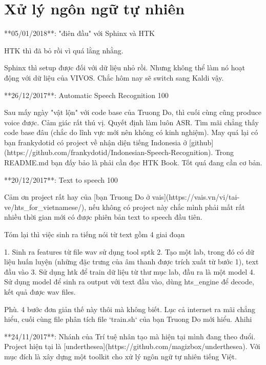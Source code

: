 \chapter{Xử lý ngôn ngữ tự nhiên}

**05/01/2018**: "điên đầu" với Sphinx và HTK

HTK thì đã bỏ rồi vì quá lằng nhằng.

Sphinx thì setup được đối với dữ liệu nhỏ rồi. Nhưng không thể làm nó hoạt động với dữ liệu của VIVOS. Chắc hôm nay sẽ switch sang Kaldi vậy.

**26/12/2017**: Automatic Speech Recognition 100

Sau mấy ngày "vật lộn" với code base của Truong Do, thì cuối cùng cũng produce voice được. Cảm giác rất thú vị. Quyết định làm luôn ASR. Tìm mãi chẳng thấy code base đâu (chắc do lĩnh vực mới nên không có kinh nghiệm). May quá lại có bạn frankydotid có project về nhận diện tiếng Indonesia ở [github](https://github.com/frankydotid/Indonesian-Speech-Recognition). Trong README.md bạn đấy bảo là phải cần đọc HTK Book. Tốt quá đang cần cơ bản.

**20/12/2017**: Text to speech 100

Cảm ơn project rất hay của [bạn Truong Do ở vais](https://vais.vn/vi/tai-ve/hts_for_vietnamese/), nếu không có project này chắc mình phải mất rất nhiều thời gian mới có được phiên bản text to speech đầu tiên.

Tóm lại thì việc sinh ra tiếng nói từ text gồm 4 giai đoạn

1. Sinh ra features từ file wav sử dụng tool sptk
2. Tạo một lab, trong đó có dữ liệu huấn luyện (những đặc trưng của âm thanh được trích xuất từ bước 1), text đầu vào
3. Sử dụng htk để train dữ liệu từ thư mục lab, đầu ra là một model
4. Sử dụng model để sinh ra output với text đầu vào, dùng hts_engine để decode, kết quả được wav files.

Phù. 4 bước đơn giản thế này thôi mà không biết. Lục cả internet ra mãi chẳng hiểu, cuối cùng file phân tích file `train.sh` của bạn Truong Do mới hiểu. Ahihi

**24/11/2017**: Nhánh của Trí tuệ nhân tạo mà hiện tại mình đang theo đuổi. Project hiện tại là [underthesea](https://github.com/magizbox/underthesea). Với mục đích là xây dựng một toolkit cho xử lý ngôn ngữ tự nhiên tiếng Việt.

